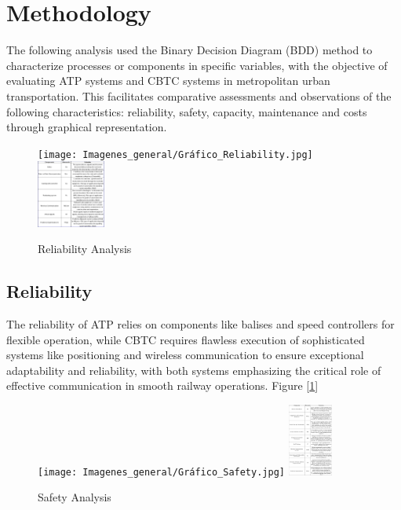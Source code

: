 \documentclass[conference]{IEEEtran}
\begin{document}

\section{Methodology}
The following analysis used the Binary Decision Diagram (BDD) \cite{b6} \cite{b5} method to characterize processes or components in specific variables, with the objective of evaluating ATP systems and CBTC systems in metropolitan urban transportation. This facilitates comparative assessments and observations of the following characteristics: reliability\cite{b7}, safety, capacity, maintenance and costs through graphical representation.
\begin{figure}[htbp]
 \centering
        \texttt{[image: Imagenes\_general/Gráfico\_Reliability.jpg]}
        \includegraphics[width=0.20\textwidth,scale=1]{Imagenes_general/Rliability_tabla.jpg}
\caption{Reliability Analysis}
 \label{fig:Reliability Analysis}
\end{figure}

\subsection{Reliability}
The reliability of ATP relies on components like balises and speed controllers for flexible operation, while CBTC requires flawless execution of sophisticated systems like positioning and wireless communication to ensure exceptional adaptability and reliability, with both systems emphasizing the critical role of effective communication in smooth railway operations. Figure [\ref{fig:Reliability Analysis}]\\
\begin{figure}[htbp]
    \centering
    \texttt{[image: Imagenes\_general/Gráfico\_Safety.jpg]}
    \includegraphics[width=0.13\textwidth,scale=1]{Imagenes_general/Tabla_Safety.png}
    \caption{Safety Analysis}
    \label{fig:Safety Analysis}
\end{figure}
\end{document}
